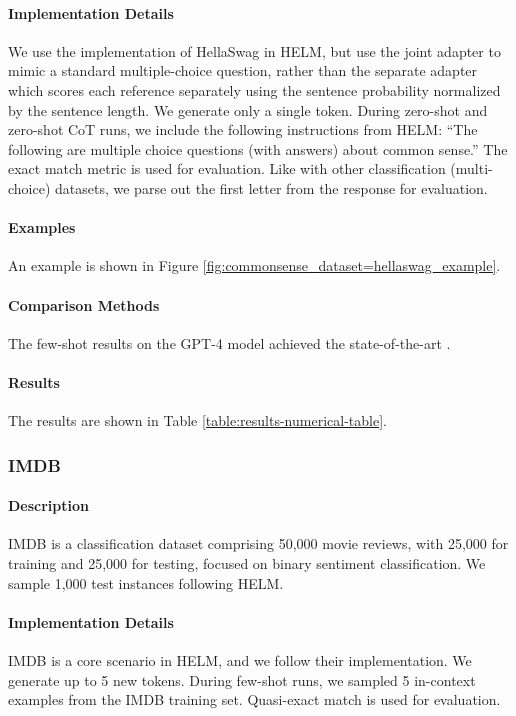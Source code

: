 \paragraph{Implementation Details}
We use the implementation of HellaSwag in HELM, but use the joint adapter to mimic a standard multiple-choice question, rather than the separate adapter which scores each reference separately using the sentence probability normalized by the sentence length. We generate only a single token. During zero-shot and zero-shot CoT runs, we include the following instructions from HELM: ``The following are multiple choice questions (with answers) about common sense.'' The exact match metric is used for evaluation. Like with other classification (multi-choice) datasets, we parse out the first letter from the response for evaluation.

\paragraph{Examples} An example is shown in Figure \ref{fig:commonsense_dataset=hellaswag_example}.

\paragraph{Comparison Methods}
The few-shot results on the GPT-4 model achieved the state-of-the-art \citep{openai2023gpt4}.

\paragraph{Results} The results are shown in Table \ref{table:results-numerical-table}.

\subsubsection{IMDB}
\paragraph{Description} IMDB \citep{maas-etal-2011-learning} is a classification dataset comprising 50,000 movie reviews, with 25,000 for training and 25,000 for testing, focused on binary sentiment classification. We sample 1,000 test instances following HELM.

\paragraph{Implementation Details}
IMDB is a core scenario in HELM, and we follow their implementation. We generate up to 5 new tokens. During few-shot runs, we sampled 5 in-context examples from the IMDB training set. Quasi-exact match is used for evaluation. 

